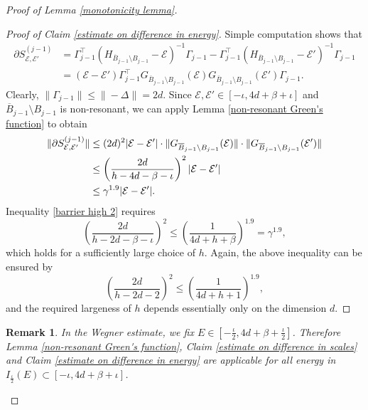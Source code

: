 \documentclass[11pt,reqno,UTF8,twoside]{amsart}
\newcommand{\mcE}{\mathcal{E}}
\newcommand{\barB}{\overline{B}}
\newcommand{\partialSjminusone}{\partial {S}^{(j-1)}}
\newtheorem{rmk}{\bf Remark}[section]
\theoremstyle{definition}
\numberwithin{equation}{section}
\begin{document}
\begin{proof}[Proof of Lemma \ref{monotonicity lemma}]
\begin{proof}[Proof of Claim \ref{estimate on difference in energy}]
   Simple computation shows that 
  \begin{align*}
    \partialSjminusone_{\mcE,\mcE'} &= \Gamma_{j-1}^{\top}(H_{\barB_{j-1}\setminus B_{j-1}}-\mcE)^{-1}\Gamma_{j-1}-\Gamma_{j-1}^{\top}(H_{\barB_{j-1}\setminus B_{j-1}}-\mcE')^{-1}\Gamma_{j-1} \\
        &=(\mcE-\mcE')\Gamma_{j-1}^{\top}G_{\barB_{j-1}\setminus B_{j-1}}(\mcE)G_{\barB_{j-1}\setminus B_{j-1}}(\mcE')\Gamma_{j-1}.
  \end{align*}
  Clearly, $\|\Gamma_{j-1}\|\leq \|-\Delta\| =2d$. Since $\mcE,\mcE'\in [-\iota,4d+\beta+\iota]$ and $\barB_{j-1}\setminus B_{j-1}$ is non-resonant, we can apply Lemma \ref{non-resonant Green's function} to  obtain 
  \begin{align}\label{barrier high 2}
   \notag \| \partialSjminusone_{\mcE,\mcE'}  \| & \leq (2d)^2 |\mcE-\mcE'|\cdot  \| G_{\barB_{j-1}\setminus B_{j-1}}(\mcE) \|\cdot \| G_{\barB_{j-1}\setminus B_{j-1}}(\mcE') \| \\
      \notag   & \leq \left(\frac{2d}{h-4d-\beta-\iota}\right)^{2} |\mcE-\mcE'| \\
         &\leq \gamma^{1.9} |\mcE-\mcE'|.
  \end{align}
  Inequality \eqref{barrier high 2} requires 
    \[\left(\frac{2d}{h-2d-\beta-\iota}\right)^{2} \leq \left(\frac{1}{4d+h+\beta}\right)^{1.9} =\gamma^{1.9},\]
      which holds for a sufficiently large choice of $h$. Again, the above inequality can be ensured by 
      \begin{equation}\label{essential barrier high 2}
            \left(\frac{2d}{h-2d-2}\right)^{2} \leq \left(\frac{1}{4d+h+1}\right)^{1.9} ,
      \end{equation}
      and the required largeness of $h$ depends essentially only on the dimension $d$.
\end{proof}
\begin{rmk}\label{applicable region}
  In the Wegner estimate, we fix $E\in [-\frac{\iota}{2},4d+\beta+\frac{\iota}{2}] $. Therefore Lemma \ref{non-resonant Green's function}, Claim \ref{estimate on difference in scales} and Claim \ref{estimate on difference in energy} are  applicable for all energy in $I_{\frac{\iota}{2}}(E)\subset [-\iota,4d+\beta+\iota]$. 
\end{rmk}





\end{proof}
\end{document}
